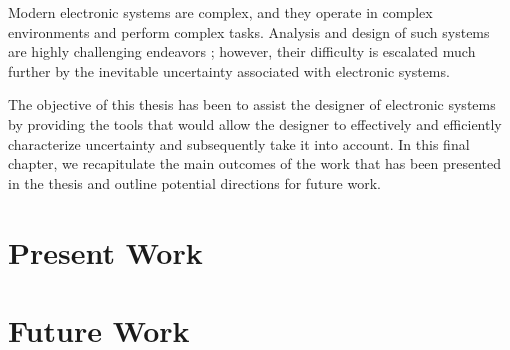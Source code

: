 Modern electronic systems are complex, and they operate in complex environments
and perform complex tasks. Analysis and design of such systems are highly
challenging endeavors \perse; however, their difficulty is escalated much
further by the inevitable uncertainty associated with electronic systems.

The objective of this thesis has been to assist the designer of electronic
systems by providing the tools that would allow the designer to effectively and
efficiently characterize uncertainty and subsequently take it into account. In
this final chapter, we recapitulate the main outcomes of the work that has been
presented in the thesis and outline potential directions for future work.

\section{Present Work}

\section{Future Work}
